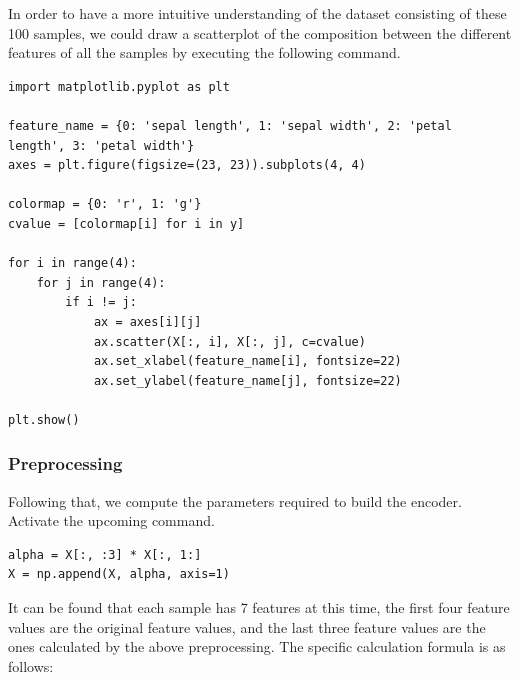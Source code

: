 In order to have a more intuitive understanding of the dataset consisting of these 100 samples, we could draw a scatterplot of the composition between the different features of all the samples by executing the following command.

\begin{lstlisting}
import matplotlib.pyplot as plt                                                           

feature_name = {0: 'sepal length', 1: 'sepal width', 2: 'petal length', 3: 'petal width'} 
axes = plt.figure(figsize=(23, 23)).subplots(4, 4)                                        

colormap = {0: 'r', 1: 'g'}                                                               
cvalue = [colormap[i] for i in y]                                                         

for i in range(4):
    for j in range(4):
        if i != j:
            ax = axes[i][j]                                                              
            ax.scatter(X[:, i], X[:, j], c=cvalue)                                        
            ax.set_xlabel(feature_name[i], fontsize=22)                                   
            ax.set_ylabel(feature_name[j], fontsize=22)                                   
            
plt.show()   
\end{lstlisting}



\subsubsection{Preprocessing}
Following that, we compute the parameters required to build the encoder.  Activate the upcoming command.

\begin{lstlisting}
alpha = X[:, :3] * X[:, 1:]
X = np.append(X, alpha, axis=1)
\end{lstlisting}

It can be found that each sample has 7 features at this time, the first four feature values are the original feature values, and the last three feature values are the ones calculated by the above preprocessing. The specific calculation formula is as follows:

